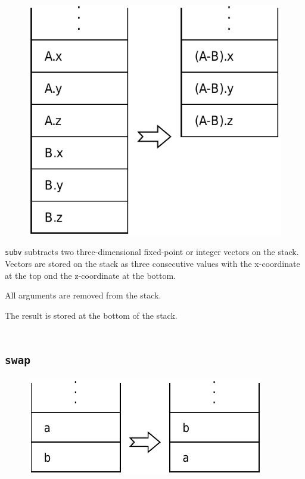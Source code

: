 		\begin{figure}
			\begin{flushright}
				\includegraphics[width=\linewidth]{figure/pdf/i_subv} 
			\end{flushright}
		\end{figure}
	
			\texttt{subv} subtracts two three-dimensional fixed-point or
			integer vectors on the stack. Vectors are stored on the stack as
			three consecutive values with the x-coordinate at the top ond the
			z-coordinate at the bottom.
			
			All arguments are removed from the stack.
			
			The result is stored at the bottom of the stack.\\\\
	
	\qquad\qquad 
	
	\subsection*{\texttt{swap}}
	
		\begin{figure}
			\begin{flushright}
				\includegraphics[width=\linewidth]{figure/pdf/i_swap} 
			\end{flushright}
		\end{figure}
	
